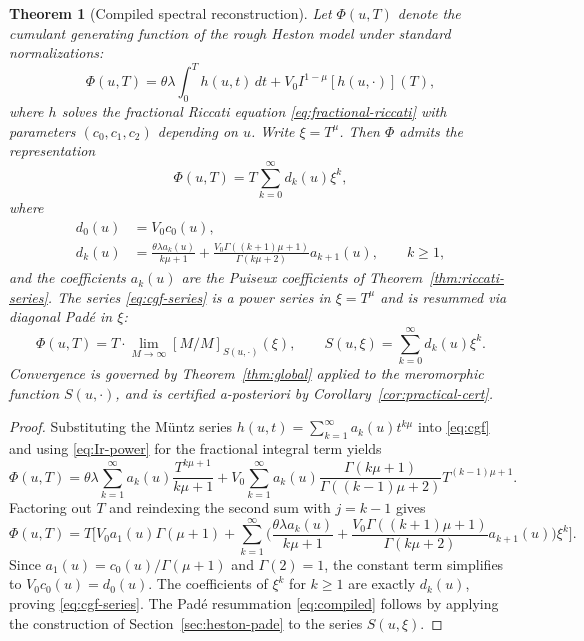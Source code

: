 \documentclass[11pt]{article}
\newtheorem{theorem}{Theorem}[section]
\theoremstyle{definition}
\theoremstyle{remark}
\begin{document}
\begin{theorem}[Compiled spectral reconstruction]
\label{thm:compiled}
Let $\Phi(u,T)$ denote the cumulant generating function of the rough Heston model under standard normalizations:
\begin{equation}
\Phi(u,T)=\theta\lambda\int_{0}^{T}h(u,t)\,dt+V_{0}I^{1-\mu}[h(u,\cdot)](T),
\label{eq:cgf}
\end{equation}
where $h$ solves the fractional Riccati equation \eqref{eq:fractional-riccati} with parameters $(c_{0},c_{1},c_{2})$ depending on $u$. Write $\xi=T^{\mu}$. Then $\Phi$ admits the representation
\begin{equation}
\Phi(u,T)=T\sum_{k=0}^{\infty}d_{k}(u)\xi^{k},
\label{eq:cgf-series}
\end{equation}
where
\begin{align}
d_{0}(u)&=V_{0}c_{0}(u),\\
d_{k}(u)&=\frac{\theta\lambda a_{k}(u)}{k\mu+1}+\frac{V_{0}\Gamma((k+1)\mu+1)}{\Gamma(k\mu+2)}a_{k+1}(u),\qquad k\ge 1,
\label{eq:dk}
\end{align}
and the coefficients $a_{k}(u)$ are the Puiseux coefficients of Theorem~\ref{thm:riccati-series}. The series \eqref{eq:cgf-series} is a power series in $\xi=T^{\mu}$ and is resummed via diagonal Pad\'e in $\xi$:
\begin{equation}
\Phi(u,T)=T\cdot\lim_{M\to\infty}[M/M]_{S(u,\cdot)}(\xi),\qquad S(u,\xi)=\sum_{k=0}^{\infty}d_{k}(u)\xi^{k}.
\label{eq:compiled}
\end{equation}
Convergence is governed by Theorem~\ref{thm:global} applied to the meromorphic function $S(u,\cdot)$, and is certified a-posteriori by Corollary~\ref{cor:practical-cert}.
\end{theorem}

\begin{proof}
Substituting the M\"untz series $h(u,t)=\sum_{k=1}^{\infty}a_{k}(u)t^{k\mu}$ into \eqref{eq:cgf} and using \eqref{eq:Ir-power} for the fractional integral term yields
\[
\Phi(u,T)=\theta\lambda\sum_{k=1}^{\infty}a_{k}(u)\frac{T^{k\mu+1}}{k\mu+1}+V_{0}\sum_{k=1}^{\infty}a_{k}(u)\frac{\Gamma(k\mu+1)}{\Gamma((k-1)\mu+2)}T^{(k-1)\mu+1}.
\]
Factoring out $T$ and reindexing the second sum with $j=k-1$ gives
\[
\Phi(u,T)=T\Biggl[V_{0}a_{1}(u)\Gamma(\mu+1)+\sum_{k=1}^{\infty}\biggl(\frac{\theta\lambda a_{k}(u)}{k\mu+1}+\frac{V_{0}\Gamma((k+1)\mu+1)}{\Gamma(k\mu+2)}a_{k+1}(u)\biggr)\xi^{k}\Biggr].
\]
Since $a_{1}(u)=c_{0}(u)/\Gamma(\mu+1)$ and $\Gamma(2)=1$, the constant term simplifies to $V_{0}c_{0}(u)=d_{0}(u)$. The coefficients of $\xi^{k}$ for $k\ge 1$ are exactly $d_{k}(u)$, proving \eqref{eq:cgf-series}. The Pad\'e resummation \eqref{eq:compiled} follows by applying the construction of Section~\ref{sec:heston-pade} to the series $S(u,\xi)$.
\end{proof}
\end{document}
